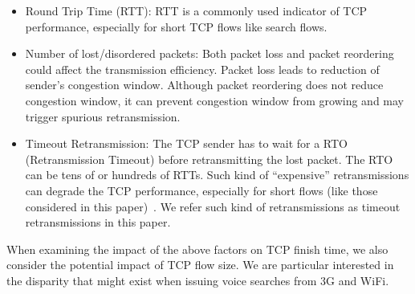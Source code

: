\begin{itemize}
	\item {Round Trip Time (RTT): } RTT is a commonly used indicator of TCP performance, especially for short TCP flows like search flows.
	
	\item {Number of lost/disordered packets: } Both packet loss and packet reordering could affect the transmission efficiency. Packet loss leads to reduction of sender's congestion window. Although packet reordering does not reduce congestion window, it can prevent congestion window from growing and may trigger spurious retransmission. 
	
	\item {Timeout Retransmission: } The TCP sender has to wait for a RTO (Retransmission Timeout) before retransmitting the lost packet. The RTO can be tens of or hundreds of RTTs. Such kind of ``expensive'' retransmissions can degrade the TCP performance, especially for short flows (like those considered in this paper)~\cite{flach2013reducing}. We refer such kind of retransmissions as timeout retransmissions in this paper.

	
\end{itemize}

When examining the impact of the above factors on TCP finish time, we also consider the potential impact of TCP flow size. We are particular interested in the disparity that might exist when issuing voice searches from 3G and WiFi. 